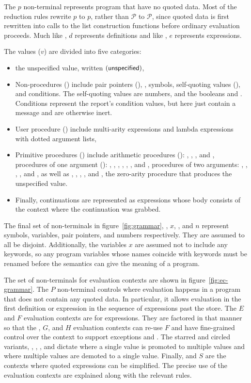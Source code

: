 The $p$ non-terminal represents program that have no quoted
data. Most of the reduction rules rewrite $p$ to $p$,
rather than $\mathcal{P}$ to $\mathcal{P}$, since quoted data is first
rewritten into calls to the list construction functions before
ordinary evaluation proceeds. Much like , $d$
represents definitions and like , $e$ represents
expressions.

The values ($v$) are divided into five categories:
%
\begin{itemize}
\item the unspecified value, written $(\textnormal{\textsf{unspecified}})$,
\item Non-procedures () include pair pointers
  (), , symbols, self-quoting values
  (), and conditions. The self-quoting values are numbers,
  and the booleans \semtrue{} and \semfalse{}. Conditions represent
  the report's condition values, but here just contain a message and
  are otherwise inert.
\item User procedure () include multi-arity
   expressions and lambda expressions with dotted
  argument lists,
\item Primitive procedures () include arithmetic procedures
  (): \va{+}, \va{-}, \va{/}, and \va{*}, procedures of one
  argument (): , , , ,
  , , and , procedures of
  two arguments: , , , ,
  and , as well as , ,
  , , and , the zero-arity
  procedure that produces the unspecified value.
\item Finally, continuations are represented as  expressions
  whose body consists of the context where the continuation was
  grabbed.
\end{itemize}
%
The final set of non-terminals in figure~\ref{fig:grammar}, ,
$x$, , and $n$ represent symbols, variables, pair pointers, and
numbers respectively. They are assumed to all be disjoint.
Additionally, the variables $x$ are assumed not to include any
keywords, so any program variables whose names coincide with keywords
must be renamed before the semantics can give the meaning of a
program.

The set of non-terminals for evaluation contexts are shown in
figure~\ref{fig:ec-grammar}. The $P$ non-terminal controls where
evaluation happens in a program that does not contain any quoted data.
In particular, it allows evaluation in the first definition or
expression in the sequence of expressions past the store. The $E$ and
$F$ evaluation contexts are for expressions.  They are factored in
that manner so that the , $G$, and $H$ evaluation contexts can
re-use $F$ and have fine-grained control over the context to support
exceptions and . The starred and circled variants,
\Estar{}, \Eo, \Fstar, and \Fo{} dictate where a single value is
promoted to multiple values and where multiple values are demoted to a
single value. Finally,  and $S$ are the contexts where quoted
expressions can be simplified. The precise use of the evaluation
contexts are explained along with the relevant rules.

